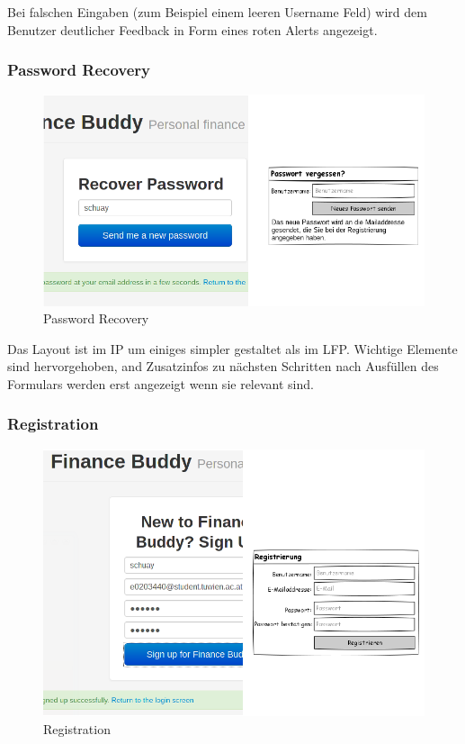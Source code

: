 \documentclass[a4paper,10pt]{article}
\begin{document}
Bei falschen Eingaben (zum Beispiel einem leeren Username Feld) wird dem Benutzer
deutlicher Feedback in Form eines roten Alerts angezeigt.

\clearpage
\subsubsection{Password Recovery}

\begin{figure}
\centering
\includegraphics[width=\textwidth]{password-recovery}
\caption{Password Recovery} \label{fig:password-recovery}
\end{figure}

Das Layout ist im IP um einiges simpler gestaltet als im LFP. Wichtige Elemente
sind hervorgehoben, and Zusatzinfos zu n\"achsten Schritten nach Ausf\"ullen
des Formulars werden erst angezeigt wenn sie relevant sind.

\clearpage
\subsubsection{Registration}

\begin{figure}
\centering
\includegraphics[width=\textwidth]{registration}
\caption{Registration} \label{fig:registration}
\end{figure}
\end{document}

